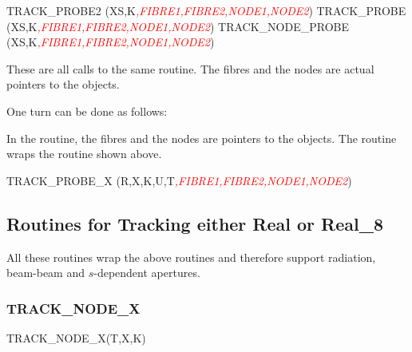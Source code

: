 %
\begin{ptccode}
TRACK_PROBE2 (XS,K\textit{\textcolor{red}{,FIBRE1,FIBRE2,NODE1,NODE2}})
TRACK_PROBE (XS,K\textit{\textcolor{red}{,FIBRE1,FIBRE2,NODE1,NODE2}})
TRACK_NODE_PROBE (XS,K\textit{\textcolor{red}{,FIBRE1,FIBRE2,NODE1,NODE2}})
\end{ptccode}

These are all calls to the same routine. The fibres and the nodes
are actual pointers to the objects.

%
One turn can be done as follows:


%
In the  routine, the fibres and the nodes are pointers to the objects.
The routine wraps the  routine shown above.

\begin{ptccode}
TRACK_PROBE_X (R,X,K,U,T\textit{\textcolor{red}{,FIBRE1,FIBRE2,NODE1,NODE2}})
\end{ptccode}



\subsection{Routines for Tracking either Real or Real\_8}

All these routines wrap the above routines and therefore support radiation,
beam-beam and $s$-dependent apertures.


\subsubsection{TRACK\_NODE\_X}

%
\begin{ptccode}
TRACK_NODE_X(T,X,K)
\end{ptccode}

